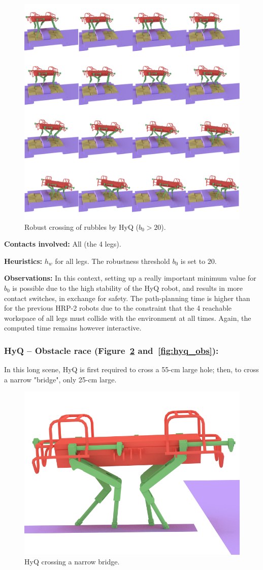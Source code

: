 \begin{figure}
  \centering
  \includegraphics[width=0.5\linewidth]{figures/darpa}
  \caption{
           Robust crossing of rubbles by HyQ ($b_0 > 20$). }
		   \label{fig:darpa}
\end{figure}


\noindent\textbf{Contacts involved:} All (the 4 legs).

\noindent\textbf{Heuristics:} $h_w$ for all legs. The robustness threshold $b_0$ is set to $20$.

\noindent\textbf{Observations:} In this context, setting up a really important minimum value for $b_0$ is possible due to the high
stability of the HyQ robot, and results in more contact switches, in exchange for safety. The path-planning time is higher than for the previous HRP-2 robots due to the constraint that the 4 reachable workspace of all legs must
collide with the environment at all times. %
Again, the computed time remains however interactive.

\subsubsection{HyQ -- Obstacle race (Figure~\ref{fig:hyq_bridge} and~\ref{fig:hyq_obs}):}
In this long scene, HyQ is first required to cross a 55-cm large hole; then, to cross a narrow "bridge",  only 25-cm large.

\begin{figure}
  \centering
  \includegraphics[width=0.4\linewidth]{figures/hyq_bridge}
  \caption{
           HyQ crossing a narrow bridge. }
		   \label{fig:hyq_bridge}
\end{figure}

